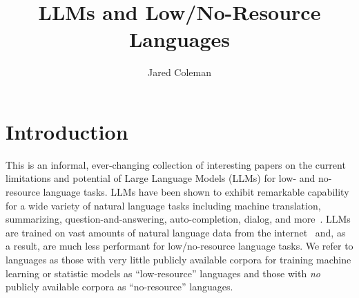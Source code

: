 \documentclass{article}
\title{LLMs and Low/No-Resource Languages}
\author{Jared Coleman}
\affil{Loyola Marymount University}
\date{}
\begin{document}
\maketitle



\section*{Introduction}
This is an informal, ever-changing collection of interesting papers on the current limitations and potential of Large Language Models (LLMs) for low- and no-resource language tasks.
LLMs have been shown to exhibit remarkable capability for a wide variety of natural language tasks including machine translation, summarizing, question-and-answering, auto-completion, dialog, and more~\cite{gpt:agi}.
LLMs are trained on vast amounts of natural language data from the internet~\cite{gpt:gpt4-tech-report} and, as a result, are much less performant for low/no-resource language tasks.
We refer to languages as those with very little publicly available corpora for training machine learning or statistic models as ``low-resource'' languages and those with \textit{no} publicly available corpora as ``no-resource'' languages.
\end{document}
